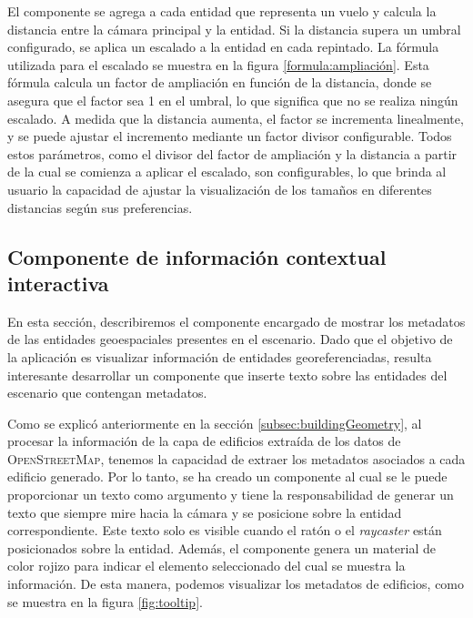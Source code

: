 \documentclass[a4paper, 11pt]{book}
\begin{document}
El componente se agrega a cada entidad que representa un vuelo y calcula la distancia entre la cámara principal y la entidad. Si la distancia supera un umbral configurado, se aplica un escalado a la entidad en cada repintado. La fórmula utilizada para el escalado se muestra en la figura \ref{formula:ampliación}. Esta fórmula calcula un factor de ampliación en función de la distancia, donde se asegura que el factor sea 1 en el umbral, lo que significa que no se realiza ningún escalado. A medida que la distancia aumenta, el factor se incrementa linealmente, y se puede ajustar el incremento mediante un factor divisor configurable. 
Todos estos parámetros, como el divisor del factor de ampliación y la distancia a partir de la cual se comienza a aplicar el escalado, son configurables, lo que brinda al usuario la capacidad de ajustar la visualización de los tamaños en diferentes distancias según sus preferencias.

\subsection{Componente de información contextual interactiva}
\label{subsec:tooltip}
En esta sección, describiremos el componente encargado de mostrar los metadatos de las entidades geoespaciales presentes en el escenario. Dado que el objetivo de la aplicación es visualizar información de entidades georeferenciadas, resulta interesante desarrollar un componente que inserte texto sobre las entidades del escenario que contengan metadatos.

Como se explicó anteriormente en la sección \ref{subsec:buildingGeometry}, al procesar la información de la capa de edificios extraída de los datos de \textsc{OpenStreetMap}, tenemos la capacidad de extraer los metadatos asociados a cada edificio generado. 
Por lo tanto, se ha creado un componente al cual se le puede proporcionar un texto como argumento y tiene la responsabilidad de generar un texto que siempre mire hacia la cámara y se posicione sobre la entidad correspondiente. 
Este texto solo es visible cuando el ratón o el \emph{raycaster} están posicionados sobre la entidad. Además, el componente genera un material de color rojizo para indicar el elemento seleccionado del cual se muestra la información. De esta manera, podemos visualizar los metadatos de edificios, como se muestra en la figura \ref{fig:tooltip}.
\end{document}
